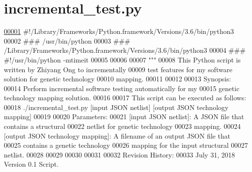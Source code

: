 \hypertarget{incremental__test_8py_source}{}\section{incremental\+\_\+test.\+py}

\begin{DoxyCode}
\hypertarget{incremental__test_8py_source_l00001}{}\hyperlink{namespaceincremental__test}{00001} \textcolor{comment}{#!/Library/Frameworks/Python.framework/Versions/3.6/bin/python3}
00002 \textcolor{comment}{### /usr/bin/python}
00003 \textcolor{comment}{### /Library/Frameworks/Python.framework/Versions/3.6/bin/python3}
00004 \textcolor{comment}{### #!/usr/bin/python -mtimeit}
00005 
00006 
00007 \textcolor{stringliteral}{"""}
00008 \textcolor{stringliteral}{    This Python script is written by Zhiyang Ong to incrementally}
00009 \textcolor{stringliteral}{        test features for my software solution for genetic technology}
00010 \textcolor{stringliteral}{        mapping.}
00011 \textcolor{stringliteral}{}
00012 \textcolor{stringliteral}{}
00013 \textcolor{stringliteral}{    Synopsis:}
00014 \textcolor{stringliteral}{    Perform incremental software testing automatically for my}
00015 \textcolor{stringliteral}{        genetic technology mapping solution.}
00016 \textcolor{stringliteral}{}
00017 \textcolor{stringliteral}{    This script can be executed as follows:}
00018 \textcolor{stringliteral}{    ./incremental\_test.py [input JSON netlist] [output JSON technology mapping]}
00019 \textcolor{stringliteral}{}
00020 \textcolor{stringliteral}{    Parameters:}
00021 \textcolor{stringliteral}{    [input JSON netlist]:               A JSON file that contains a structural}
00022 \textcolor{stringliteral}{                                            netlist for genetic technology}
00023 \textcolor{stringliteral}{                                            mapping.}
00024 \textcolor{stringliteral}{    [output JSON technology mapping]:   A filename of an output JSON file that}
00025 \textcolor{stringliteral}{                                            contains a genetic technology}
00026 \textcolor{stringliteral}{                                            mapping for the input structural}
00027 \textcolor{stringliteral}{                                            netlist.}
00028 \textcolor{stringliteral}{}
00029 \textcolor{stringliteral}{}
00030 \textcolor{stringliteral}{}
00031 \textcolor{stringliteral}{}
00032 \textcolor{stringliteral}{    Revision History:}
00033 \textcolor{stringliteral}{    July 31, 2018           Version 0.1 Script.}

\end{DoxyCode}
